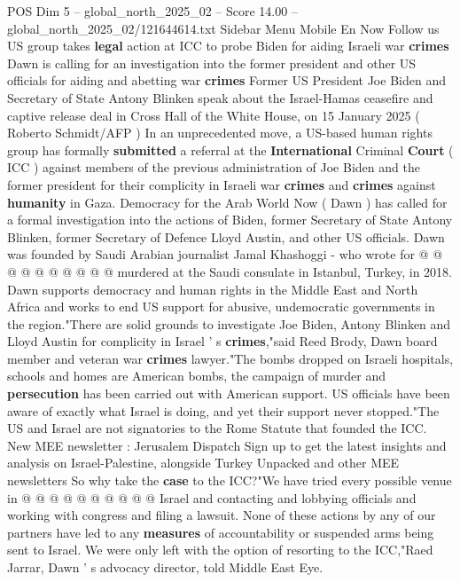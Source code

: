 \begin{textsample}{POS Dim 5 – global\_north\_2025\_02 – Score 14.00 – global\_north\_2025\_02/121644614.txt}  \label{ex:f5_pos_334}
Sidebar Menu Mobile En Now Follow us US group takes \textbf{legal} action at ICC to probe Biden for aiding Israeli war \textbf{crimes} Dawn is calling for an investigation into the former president and other US officials for aiding and abetting war \textbf{crimes} Former US President Joe Biden and Secretary of State Antony Blinken speak about the Israel-Hamas ceasefire and captive release deal in Cross Hall of the White House, on 15 January 2025 ( Roberto Schmidt/AFP ) In an unprecedented move, a US-based human rights group has formally \textbf{submitted} a referral at the \textbf{International} Criminal \textbf{Court} ( ICC ) against members of the previous administration of Joe Biden and the former president for their complicity in Israeli war \textbf{crimes} and \textbf{crimes} against \textbf{humanity} in Gaza.
Democracy for the Arab World Now ( Dawn ) has called for a formal investigation into the actions of Biden, former Secretary of State Antony Blinken, former Secretary of Defence Lloyd Austin, and other US officials.
Dawn was founded by Saudi Arabian journalist Jamal Khashoggi - who wrote for @ @ @ @ @ @ @ @ @ @ murdered at the Saudi consulate in Istanbul, Turkey, in 2018.
Dawn supports democracy and human rights in the Middle East and North Africa and works to end US support for abusive, undemocratic governments in the region."There are solid grounds to investigate Joe Biden, Antony Blinken and Lloyd Austin for complicity in Israel ' s \textbf{crimes},"said Reed Brody, Dawn board member and veteran war \textbf{crimes} lawyer."The bombs dropped on Israeli hospitals, schools and homes are American bombs, the campaign of murder and \textbf{persecution} has been carried out with American support.
US officials have been aware of exactly what Israel is doing, and yet their support never stopped."The US and Israel are not signatories to the Rome Statute that founded the ICC.
New MEE newsletter : Jerusalem Dispatch Sign up to get the latest insights and analysis on Israel-Palestine, alongside Turkey Unpacked and other MEE newsletters So why take the \textbf{case} to the ICC?"We have tried every possible venue in @ @ @ @ @ @ @ @ @ @ Israel and contacting and lobbying officials and working with congress and filing a lawsuit.
None of these actions by any of our partners have led to any \textbf{measures} of accountability or suspended arms being sent to Israel.
We were only left with the option of resorting to the ICC,"Raed Jarrar, Dawn ' s advocacy director, told Middle East Eye.

\end{textsample}
